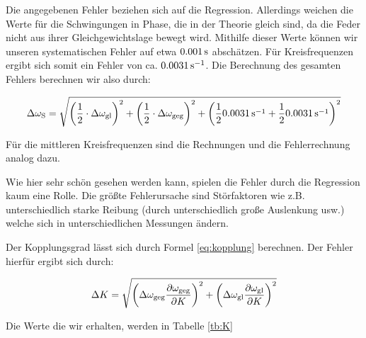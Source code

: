 Die angegebenen Fehler beziehen sich auf die Regression. Allerdings weichen die Werte für die Schwingungen in Phase, die in der Theorie gleich sind, da die Feder nicht aus ihrer Gleichgewichtslage bewegt wird. Mithilfe dieser Werte können wir unseren systematischen Fehler auf etwa $\unit[0.001]{s}$ abschätzen. Für Kreisfrequenzen ergibt sich somit ein Fehler von ca. $\unit[0.0031]{s^{-1}}$. Die Berechnung des gesamten Fehlers berechnen wir also durch:

\begin{equation*}
\Delta \omega_\n{S} = \sqrt{
\left(\frac{1}{2} \cdot \Delta\omega_\n{gl}\right)^2
+ 
\left(\frac{1}{2} \cdot \Delta\omega_\n{geg}\right)^2
+
\left(\frac12 \unit[0.0031]{s^{-1}} + \frac12 \unit[0.0031]{s^{-1}} \right)^2
}
\end{equation*}

Für die mittleren Kreisfrequenzen sind die Rechnungen und die Fehlerrechnung analog dazu.

Wie hier sehr schön gesehen werden kann, spielen die Fehler durch die Regression kaum eine Rolle. Die größte Fehlerursache sind Störfaktoren wie z.B. unterschiedlich starke Reibung (durch unterschiedlich große Auslenkung usw.) welche sich in unterschiedlichen Messungen ändern.

Der Kopplungsgrad lässt sich durch Formel \ref{eq:kopplung} berechnen. Der Fehler hierfür ergibt sich durch:

\begin{equation*}
\Delta K = \sqrt{
\left(\Delta \omega_{\mathrm{geg}}\frac{\partial \omega_{\mathrm{geg}}}{\partial K}\right)^2
+
\left(\Delta \omega_{\mathrm{gl}}\frac{\partial \omega_{\mathrm{gl}}}{\partial K}\right)^2
}
\end{equation*}

Die Werte die wir erhalten, werden in Tabelle \ref{tb:K}

\begin{table}[t]
\caption{Die berechnetet Werte für den Kopplungsgrad $K$}
\label{tb:K}
\end{table}


